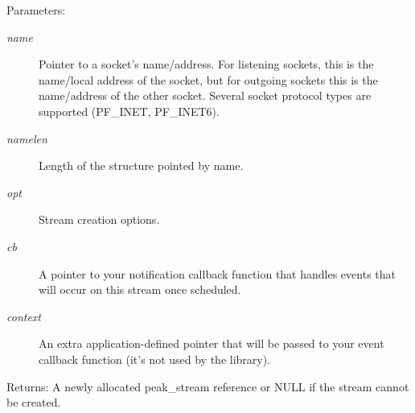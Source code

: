 \begin{Desc}
\item[Parameters:]
\begin{description}
\item[{\em name}]Pointer to a socket's name/address. For listening sockets, this is the name/local address of the socket, but for outgoing sockets this is the name/address of the other socket. Several socket protocol types are supported (PF\_\-INET, PF\_\-INET6). \item[{\em namelen}]Length of the structure pointed by name. \item[{\em opt}]Stream creation options. \item[{\em cb}]A pointer to your notification callback function that handles events that will occur on this stream once scheduled. \item[{\em context}]An extra application-defined pointer that will be passed to your event callback function (it's not used by the library).\end{description}
\end{Desc}
\begin{Desc}
\item[Returns:]A newly allocated peak\_\-stream reference or NULL if the stream cannot be created. \end{Desc}
